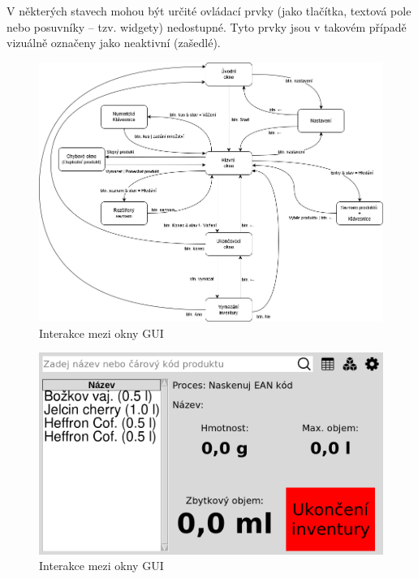 
V některých stavech mohou být určité ovládací prvky (jako tlačítka, textová pole nebo posuvníky – tzv. widgety) nedostupné. Tyto prvky jsou v takovém případě vizuálně označeny jako neaktivní (zašedlé).

\begin{figure}[!h]
    \begin{center}
        \includegraphics[scale=0.5]{obrazky/Interakce napříč okny GUI.png}
    \end{center}
    \caption{Interakce mezi okny GUI}
    \label{Interakce mezi okny GUI}
\end{figure}

\begin{figure}[H]
    \begin{center}
        \includegraphics[scale=0.4]{obrazky/GUI Vyhledávání.png}
    \end{center}
    \caption{Interakce mezi okny GUI}
    \label{Interakce mezi okny GUI}
\end{figure}


